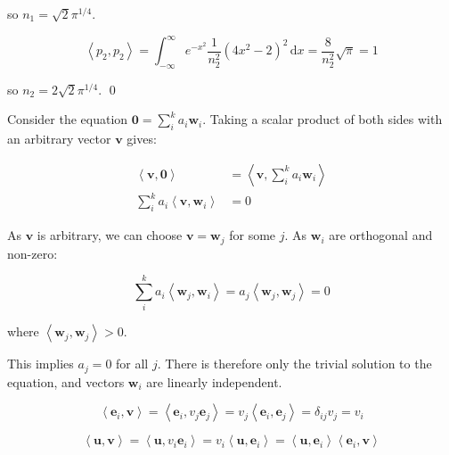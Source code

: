 \documentclass[12pt]{article}
\begin{document}
so $n_{1} = \sqrt{2} \pi^{1/4}$.

\begin{equation}
    \left\langle p_{2}, p_{2} \right\rangle = \int_{-\infty}^{\infty} e^{-x^{2}} \frac{1}{n_{2}^{2}} (4x^{2} - 2)^{2} \, \mathrm{d}x = \frac{8}{n_{2}^{2}} \sqrt{\pi} = 1
\end{equation}

so $n_{2} = 2\sqrt{2} \pi^{1/4}$.
\qed



Consider the equation $\mathbf{0} = \sum_{i}^{k} a_{i} \mathbf{w}_{i}$. Taking a scalar product of both sides with an arbitrary vector $\mathbf{v}$ gives:

\begin{equation}
    \begin{split}
        \left\langle \mathbf{v}, \mathbf{0} \right\rangle &= \left\langle \mathbf{v}, \sum_{i}^{k} a_{i} \mathbf{w}_{i} \right\rangle \\
        \sum_{i}^{k} a_{i} \left\langle \mathbf{v}, \mathbf{w}_{i} \right\rangle &= 0
    \end{split}
\end{equation}

As $\mathbf{v}$ is arbitrary, we can choose $\mathbf{v} = \mathbf{w}_{j}$ for some $j$. As $\mathbf{w}_{i}$ are orthogonal and non-zero:

\begin{equation}
    \sum_{i}^{k} a_{i} \left\langle \mathbf{w}_{j}, \mathbf{w}_{i} \right\rangle = a_{j} \left\langle \mathbf{w}_{j}, \mathbf{w}_{j} \right\rangle = 0
\end{equation}

where $\left\langle \mathbf{w}_{j}, \mathbf{w}_{j} \right\rangle > 0$.

This implies $a_{j} = 0$ for all $j$. There is therefore only the trivial solution to the equation, and vectors $\mathbf{w}_{i}$ are linearly independent.


\begin{equation}
    \left\langle \mathbf{e}_{i}, \mathbf{v} \right\rangle = \left\langle \mathbf{e}_{i}, v_{j} \mathbf{e}_{j} \right\rangle = v_{j} \left\langle \mathbf{e}_{i}, \mathbf{e}_{j} \right\rangle = \delta_{ij} v_{j} = v_{i}
\end{equation}


\begin{equation}
    \left\langle \mathbf{u}, \mathbf{v} \right\rangle = \left\langle \mathbf{u}, v_{i} \mathbf{e}_{i} \right\rangle = v_{i} \left\langle \mathbf{u}, \mathbf{e}_{i} \right\rangle = \left\langle \mathbf{u}, \mathbf{e}_{i} \right\rangle \left\langle \mathbf{e}_{i}, \mathbf{v} \right\rangle
\end{equation}
\end{document}
